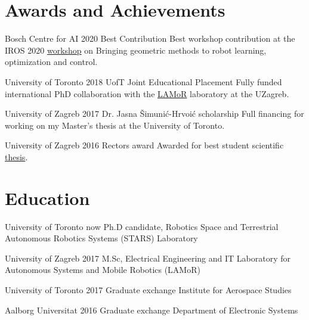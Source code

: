 \documentclass{tccv}
\begin{document}
\section{Awards and Achievements}
\begin{yearlist}
\item[Bosch Centre for AI]{2020}
     {Best Contribution}
     {{\small Best workshop contribution at the IROS 2020 \href{https://sites.google.com/view/iros2020-geometric-methods/home}{workshop} on Bringing geometric methods to robot learning, optimization and control.}}

\item[University of Toronto]{2018}
     {UofT Joint Educational Placement}
     {{\small Fully funded international PhD collaboration with the \href{https://lamor.fer.hr/}{LAMoR} laboratory at the UZagreb.}}
     
\item[University of Zagreb]{2017}
     {Dr. Jasna Šimunić-Hrvoić scholarship}
     {{\small Full financing for working on my Master's thesis at the University of Toronto.}}

\item[University of Zagreb]{2016}
     {Rectors award}
     {{\small Awarded for best student scientific \href{https://www.dropbox.com/s/k66438qy0xz13c4/rektorova.pdf?dl=0}{thesis}.}}

     
\end{yearlist}

\section{Education}
\begin{yearlist}
\item[University of Toronto]{now}
     {Ph.D candidate, Robotics}
     {{\small Space and Terrestrial Autonomous Robotics Systems (STARS) Laboratory }}
\item[University of Zagreb]{2017}
     {M.Sc, Electrical Engineering and IT}
     {{\small Laboratory for Autonomous Systems and Mobile Robotics (LAMoR)}}
\item[University of Toronto]{2017} 
     {Graduate exchange}
     {{\small Institute for Aerospace Studies}}
\item[Aalborg Universitat]{2016}
     {Graduate exchange}
     {{\small Department of Electronic Systems}}
\end{yearlist}
\vspace*{-0.5cm}
%
\end{document}
